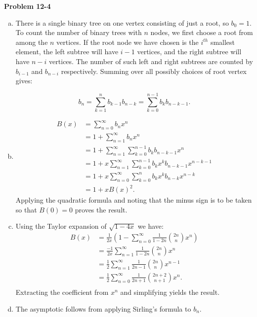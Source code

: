 \documentclass{article}
\begin{document}
\noindent\textbf{Problem 12-4}\\
\begin{enumerate}[a.]
\item There is a single binary tree on one vertex consisting of just a root, so $b_0 = 1$.  To count the number of binary trees with $n$ nodes, we first choose a root from among the $n$ vertices.  If the root node we have chosen is the $i^{th}$ smallest element, the left subtree will have $i-1$ vertices, and the right subtree will have $n-i$ vertices.  The number of such left and right subtrees are counted by $b_{i-1}$ and $b_{n-i}$ respectively.  Summing over all possibly choices of root vertex gives:

\[ b_n = \sum_{k=1}^n b_{k-1}b_{n-k} = \sum_{k=0}^{n-1} b_kb_{n-k-1}.\]

\item

\begin{align*}
B(x) &= \sum_{n=0}^\infty b_nx^n \\
&= 1 + \sum_{n=1}^\infty b_nx^n \\
&= 1+ \sum_{n=1}^\infty  \sum_{k=0}^{n-1} b_kb_{n-k-1} x^n \\
&= 1+ x\sum_{n=1}^\infty  \sum_{k=0}^{n-1} b_kx^kb_{n-k-1} x^{n-k-1} \\
&= 1+ x\sum_{n=0}^\infty  \sum_{k=0}^{n} b_kx^kb_{n-k} x^{n-k} \\
&= 1 + xB(x)^2.
\end{align*}
Applying the quadratic formula and noting that the minus sign is to be taken so that $B(0) = 0$ proves the result. \\

\item Using the Taylor expansion of $\sqrt{1-4x}$ we have:
\begin{align*}
B(x) &= \frac{1}{2x}\left(1-\sum_{n=0}^\infty \frac{1}{1-2n}{2n \choose n}x^n\right) \\
&=\frac{-1}{2x}\sum_{n=1}^\infty \frac{1}{1-2n}{2n \choose n}x^n \\
&= \frac{1}{2}\sum_{n=1}^\infty \frac{1}{2n-1}{2n \choose n}x^{n-1} \\
&=\frac{1}{2}\sum_{n=0}^\infty \frac{1}{2n+1}{2n+2 \choose n+1}x^{n}. \\
\end{align*}
Extracting the coefficient from $x^n$ and simplifying yields the result. \\

\item The asymptotic follows from applying Sirling's formula to $b_n$.

\end{enumerate}
\end{document}
